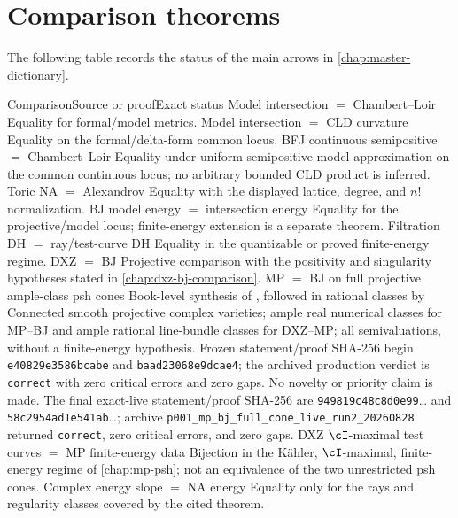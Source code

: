 \section{Comparison theorems}
\label{sec:appL-comparisons}

The following table records the status of the main arrows in
\cref{chap:master-dictionary}.

\begin{AppLProvenanceLedger}{Comparison}{Source or proof}{Exact status}
\AppLProvenanceRecord
  {Model intersection \(=\) Chambert--Loir}
  {\cite{CL06,CLD25}}
  {Equality for formal/model metrics.}
\AppLProvenanceRecord
  {Model intersection \(=\) CLD curvature}
  {\cite{CLD25,GK17}}
  {Equality on the formal/delta-form common locus.}
\AppLProvenanceRecord
  {BFJ continuous semipositive \(=\) Chambert--Loir}
  {\cite{BFJ15,CL06}}
  {Equality under uniform semipositive model approximation on the common
   continuous locus; no arbitrary bounded CLD product is inferred.}
\AppLProvenanceRecord
  {Toric NA \(=\) Alexandrov}
  {\cite{Vil20,BGJKK25}}
  {Equality with the displayed lattice, degree, and \(n!\) normalization.}
\AppLProvenanceRecord
  {BJ model energy \(=\) intersection energy}
  {\cite{BJ22}}
  {Equality for the projective/model locus; finite-energy extension is a
   separate theorem.}
\AppLProvenanceRecord
  {Filtration DH \(=\) ray/test-curve DH}
  {\cite{BHJ17,RWN14,DXZ23}}
  {Equality in the quantizable or proved finite-energy regime.}
\AppLProvenanceRecord
  {DXZ \(=\) BJ}
  {\cite{DXZ23}}
  {Projective comparison with the positivity and singularity hypotheses
   stated in \cref{chap:dxz-bj-comparison}.}
\AppLProvenanceRecord
  {MP \(=\) BJ on full projective ample-class psh cones}
  {Book-level synthesis of \cite{MP24,BJ22}, followed in rational classes by
   \cite[Theorem~3.14]{DXZ23}}
  {Connected smooth projective complex varieties; ample real numerical
   classes for MP--BJ and ample rational line-bundle classes for DXZ--MP;
   all semivaluations, without a finite-energy hypothesis.  Frozen
   statement/proof SHA-256 begin \texttt{e40829e3586bcabe} and
   \texttt{baad23068e9dcae4}; the archived production verdict is
   \texttt{correct} with zero critical errors and zero gaps.  No novelty or
   priority claim is made.  The final exact-live statement/proof SHA-256 are
   \texttt{949819c48c8d0e99}\ldots{} and
   \texttt{58c2954ad1e541ab}\ldots{}; archive
   \nolinkurl{p001_mp_bj_full_cone_live_run2_20260828} returned
   \texttt{correct}, zero critical errors, and zero gaps.}
\AppLProvenanceRecord
  {DXZ \(\cI\)-maximal test curves \(=\) MP finite-energy data}
  {\cite{MP24}}
  {Bijection in the Kähler, \(\cI\)-maximal, finite-energy regime of
   \cref{chap:mp-psh}; not an equivalence of the two unrestricted psh cones.}
\AppLProvenanceRecord
  {Complex energy slope \(=\) NA energy}
  {\cite{BHJ17,DXZ23,MP24}}
  {Equality only for the rays and regularity classes covered by the cited
   theorem.}
\end{AppLProvenanceLedger}

